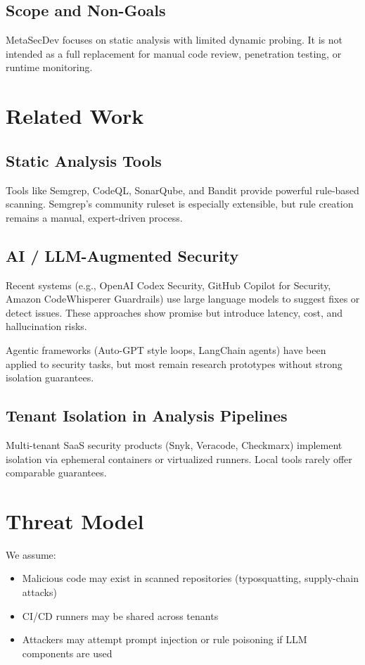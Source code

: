 \documentclass[10pt,a4paper]{article}
\begin{document}
\subsection{Scope and Non-Goals}

MetaSecDev focuses on static analysis with limited dynamic probing. It is not intended as a full replacement for manual code review, penetration testing, or runtime monitoring.

\section{Related Work}

\subsection{Static Analysis Tools}

Tools like Semgrep, CodeQL, SonarQube, and Bandit provide powerful rule-based scanning. Semgrep's community ruleset is especially extensible, but rule creation remains a manual, expert-driven process.

\subsection{AI / LLM-Augmented Security}

Recent systems (e.g., OpenAI Codex Security, GitHub Copilot for Security, Amazon CodeWhisperer Guardrails) use large language models to suggest fixes or detect issues. These approaches show promise but introduce latency, cost, and hallucination risks.

Agentic frameworks (Auto-GPT style loops, LangChain agents) have been applied to security tasks, but most remain research prototypes without strong isolation guarantees.

\subsection{Tenant Isolation in Analysis Pipelines}

Multi-tenant SaaS security products (Snyk, Veracode, Checkmarx) implement isolation via ephemeral containers or virtualized runners. Local tools rarely offer comparable guarantees.

\section{Threat Model}

We assume:
\begin{itemize}
    \item Malicious code may exist in scanned repositories (typosquatting, supply-chain attacks)
    \item CI/CD runners may be shared across tenants
    \item Attackers may attempt prompt injection or rule poisoning if LLM components are used
\end{itemize}
\end{document}
